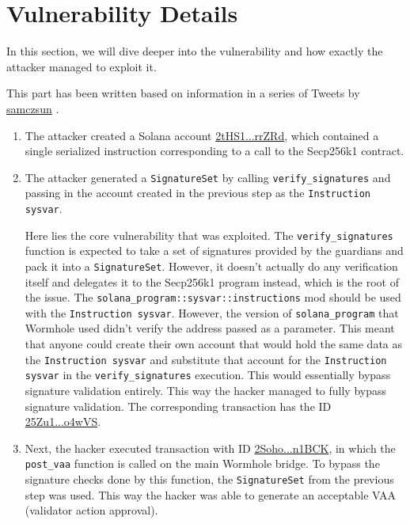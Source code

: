 \documentclass{article}
\begin{document}
\section{Vulnerability Details}

In this section, we will dive deeper into the vulnerability and how exactly the attacker managed to exploit it. 

This part has been written based on information in a series of Tweets by \href{https://twitter.com/samczsun}{samczsun} \cite{samczsun_tweet}.

\begin{enumerate}
\item The attacker created a Solana account \href{https://solscan.io/account/2tHS1cXX2h1KBEaadprqELJ6sV9wLoaSdX68FqsrrZRd}{2tHS1...rrZRd}, which contained a single serialized instruction corresponding to a call to the Secp256k1 contract. 

\item The attacker generated a \texttt{SignatureSet} by calling \texttt{verify\_signatures} and passing in the account created in the previous step as the \texttt{Instruction sysvar}. 

Here lies the core vulnerability that was exploited. The \texttt{verify\_signatures} function is expected to take a set of signatures provided by the guardians and pack it into a \texttt{SignatureSet}. However, it doesn't actually do any verification itself and delegates it to the Secp256k1 program instead, which is the root of the issue. The \texttt{solana\_program::sysvar::instructions} mod should be used with the \texttt{Instruction sysvar}. However, the version of \texttt{solana\_program} that Wormhole used didn't verify the address passed as a parameter. This meant that anyone could create their own account that would hold the same data as the \texttt{Instruction sysvar} and substitute that account for the \texttt{Instruction sysvar} in the \texttt{verify\_signatures} execution. This would essentially bypass signature validation entirely. This way the hacker managed to fully bypass signature validation. The corresponding transaction has the ID \href{https://solscan.io/tx/25Zu1L2Q9uk998d5GMnX43t9u9eVBKvbVtgHndkc2GmUFed8Pu73LGW6hiDsmGXHykKUTLkvUdh4yXPdL3Jo4wVS}{25Zu1...o4wVS}.

\item Next, the hacker executed transaction with ID \href{https://solscan.io/tx/2SohoVoPDSdzgsGCgKQPByKQkLAXHrYmvtE7EEqwKi3qUBTGDDJ7DcfYS7YJC2f8xwKVVa6SFUpH5MZ5xcyn1BCK}{2Soho...n1BCK}, in which the \texttt{post\_vaa} function is called on the main Wormhole bridge. To bypass the signature checks done by this function, the \texttt{SignatureSet} from the previous step was used. This way the hacker was able to generate an acceptable VAA (validator action approval).


\end{enumerate}
\end{document}
